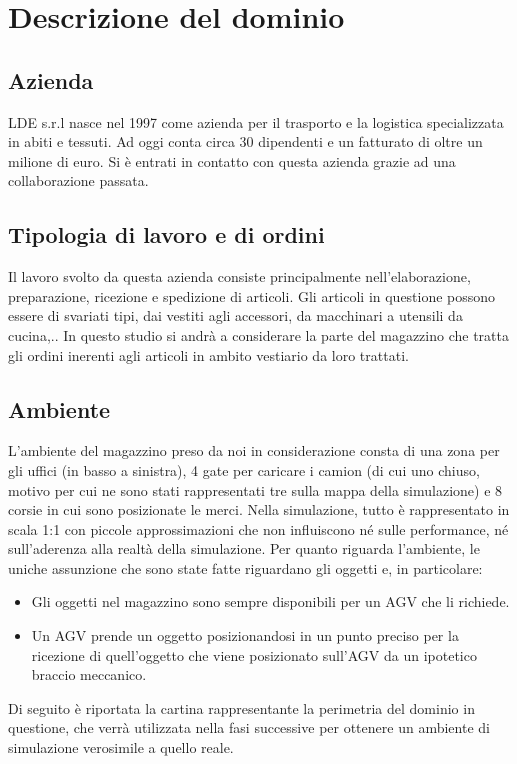 \documentclass[12pt]{article}
\begin{document}
\section{Descrizione del dominio}
\subsection{Azienda}
LDE s.r.l nasce nel 1997 come azienda per il trasporto e la logistica specializzata in abiti e tessuti. Ad oggi conta circa 30 dipendenti e un fatturato di oltre un milione di euro. Si è entrati in contatto con questa azienda grazie ad una collaborazione passata.

\subsection{Tipologia di lavoro e di ordini}
Il lavoro svolto da questa azienda consiste principalmente nell'elaborazione, preparazione, ricezione e spedizione di articoli. Gli articoli in questione possono essere di svariati tipi, dai vestiti agli accessori, da macchinari a utensili da cucina,..
In questo studio si andrà a considerare la parte del magazzino che tratta gli ordini inerenti agli articoli in ambito vestiario da loro trattati.

\subsection{Ambiente}
L'ambiente del magazzino preso da noi in considerazione consta di una zona per gli uffici (in basso a sinistra), 4 gate per caricare i camion (di cui uno chiuso, motivo per cui ne sono stati rappresentati tre sulla mappa della simulazione) e 8 corsie in cui sono posizionate le merci. Nella simulazione, tutto è rappresentato in scala 1:1 con piccole approssimazioni che non influiscono né sulle performance, né sull'aderenza alla realtà della simulazione.
Per quanto riguarda l'ambiente, le uniche assunzione che sono state fatte riguardano gli oggetti e, in particolare:
\begin{itemize}
    \item Gli oggetti nel magazzino sono sempre disponibili per un AGV che li richiede.
    \item Un AGV prende un oggetto posizionandosi in un punto preciso per la ricezione di quell’oggetto che viene posizionato sull’AGV da un ipotetico braccio meccanico.
\end{itemize}

\noindent Di seguito è riportata la cartina rappresentante la perimetria del dominio in questione, che verrà utilizzata nella fasi successive per ottenere un ambiente di simulazione verosimile a quello reale.
\end{document}
